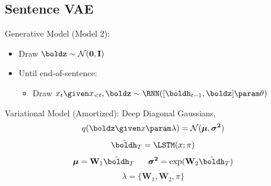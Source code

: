 
\subsection{Sentence VAE}
\begin{frame}
Generative Model (Model 2):
\begin{itemize}
    \item Draw $\boldz \sim \mathcal{N}(\mathbf{0}, \mathbf{I})$
    \item Until end-of-sentence:
    \begin{itemize}
    \item Draw $x_{t} \given x_{<t}, \boldz \sim \RNN([\boldh_{t-1}, \boldz] \param \theta)$
    \end{itemize}
\end{itemize}

Variational Model (Amortized): Deep Diagonal Gaussians, 
\[ q(\boldz \given x \param \lambda ) = \mathcal{N}(\boldsymbol{\mu}, \boldsymbol{\sigma^2}) \]
\[ \tilde{\boldh}_T = \LSTM(x; \pi) \]
\[ \boldsymbol{\mu} = \mathbf{W}_1\tilde{\boldh}_T \,\,\,\,\,\,\,\,\,\, \boldsymbol{\sigma^2} = \exp(\mathbf{W}_2 \tilde{\boldh}_T)\]
\[ \lambda = \{\mathbf{W}_1, \mathbf{W}_2, \pi\}\]
\end{frame}


